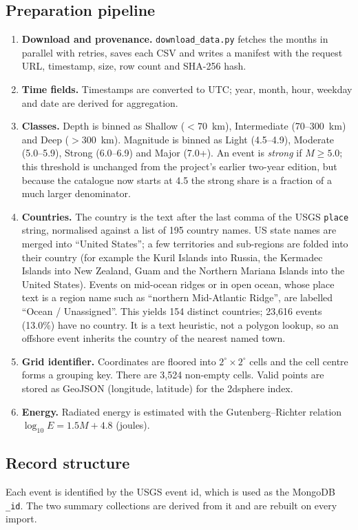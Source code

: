 \documentclass[11pt,a4paper]{article}
\begin{document}
\subsection{Preparation pipeline}
\begin{enumerate}
\item \textbf{Download and provenance.} \texttt{download\_data.py} fetches the months in parallel with retries, saves each CSV and writes a manifest with the request URL, timestamp, size, row count and SHA-256 hash.
\item \textbf{Time fields.} Timestamps are converted to UTC; year, month, hour, weekday and date are derived for aggregation.
\item \textbf{Classes.} Depth is binned as Shallow ($<70$~km), Intermediate (70--300~km) and Deep ($>300$~km). Magnitude is binned as Light (4.5--4.9), Moderate (5.0--5.9), Strong (6.0--6.9) and Major (7.0+). An event is \emph{strong} if $M \ge 5.0$; this threshold is unchanged from the project's earlier two-year edition, but because the catalogue now starts at 4.5 the strong share is a fraction of a much larger denominator.
\item \textbf{Countries.} The country is the text after the last comma of the USGS \texttt{place} string, normalised against a list of 195 country names. US state names are merged into ``United States''; a few territories and sub-regions are folded into their country (for example the Kuril Islands into Russia, the Kermadec Islands into New Zealand, Guam and the Northern Mariana Islands into the United States). Events on mid-ocean ridges or in open ocean, whose place text is a region name such as ``northern Mid-Atlantic Ridge'', are labelled ``Ocean / Unassigned''. This yields 154 distinct countries; 23,616 events (13.0\%) have no country. It is a text heuristic, not a polygon lookup, so an offshore event inherits the country of the nearest named town.
\item \textbf{Grid identifier.} Coordinates are floored into $2^\circ\times2^\circ$ cells and the cell centre forms a grouping key. There are 3,524 non-empty cells. Valid points are stored as GeoJSON (longitude, latitude) for the 2dsphere index.
\item \textbf{Energy.} Radiated energy is estimated with the Gutenberg--Richter relation $\log_{10}E = 1.5M + 4.8$ (joules).\cite{gr56}
\end{enumerate}

\subsection{Record structure}
Each event is identified by the USGS event id, which is used as the MongoDB \texttt{\_id}. The two summary collections are derived from it and are rebuilt on every import.
\end{document}
